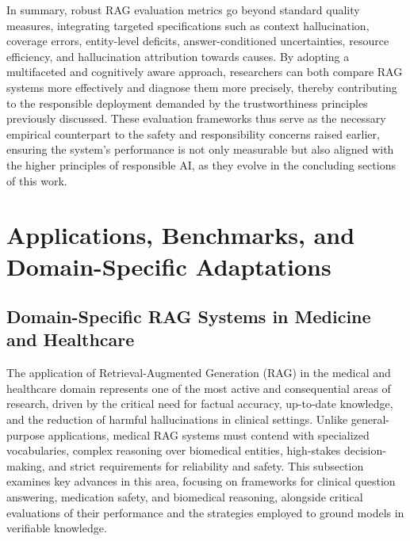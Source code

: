 \documentclass[11pt]{article}
\begin{document}
In summary, robust RAG evaluation metrics go beyond standard quality measures, integrating targeted specifications such as context hallucination, coverage errors, entity-level deficits, answer-conditioned uncertainties, resource efficiency, and hallucination attribution towards causes. By adopting a multifaceted and cognitively aware approach, researchers can both compare RAG systems more effectively and diagnose them more precisely, thereby contributing to the responsible deployment demanded by the trustworthiness principles previously discussed. These evaluation frameworks thus serve as the necessary empirical counterpart to the safety and responsibility concerns raised earlier, ensuring the system's performance is not only measurable but also aligned with the higher principles of responsible AI, as they evolve in the concluding sections of this work.

\section{Applications, Benchmarks, and Domain-Specific Adaptations}

\subsection{Domain-Specific RAG Systems in Medicine and Healthcare}

The application of Retrieval-Augmented Generation (RAG) in the medical and healthcare domain represents one of the most active and consequential areas of research, driven by the critical need for factual accuracy, up-to-date knowledge, and the reduction of harmful hallucinations in clinical settings. Unlike general-purpose applications, medical RAG systems must contend with specialized vocabularies, complex reasoning over biomedical entities, high-stakes decision-making, and strict requirements for reliability and safety. This subsection examines key advances in this area, focusing on frameworks for clinical question answering, medication safety, and biomedical reasoning, alongside critical evaluations of their performance and the strategies employed to ground models in verifiable knowledge.
\end{document}
